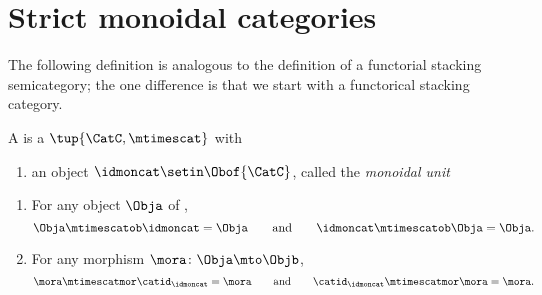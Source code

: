 
\section{Strict monoidal categories}
\label{sec:strict-monoidal-categories}

The following definition is analogous to the definition of a functorial stacking semicategory; the one difference is that we start with a functorical stacking category. 

\begin{ctdefinition}
    \label{def:strict-monoidal-category}
     A  is a  $\tup{\CatC, \mtimescat}$ with

    \constit

    \begin{enumerate}
        \item an object $\idmoncat \setin \Obof{\CatC}$, called the \emph{monoidal unit}
    \end{enumerate}

    \condit

    \begin{enumerate}
        \item For any object $\Obja$ of \CatC,
              \begin{equation}
                  \Obja \mtimescatob \idmoncat = \Obja \qquad \text{and} \qquad \idmoncat \mtimescatob \Obja = \Obja.
              \end{equation}
        \item For any morphism $\mora \colon \Obja \mto \Objb$,
              \begin{equation}
                  \mora \mtimescatmor \catid_\idmoncat = \mora \qquad \text{and} \qquad \catid_\idmoncat \mtimescatmor  \mora = \mora.
              \end{equation}
    \end{enumerate}
\end{ctdefinition}





